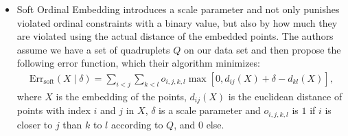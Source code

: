 \begin{itemize}
    \item Soft Ordinal Embedding  \citep[SOE,][]{teradaLocalOrdinalEmbedding2014} 
        introduces a scale parameter and not only punishes violated ordinal constraints
        with a binary value, but also by how much they are violated using the
        actual distance of the embedded points.
        The authors assume we have a set of quadruplets $Q$ on our data set
        and then propose the following error function, which their algorithm minimizes:
        \begin{align*}
            \text{Err}_{\text{soft}}(X  \mid  \delta) = \sum_{i<j} \sum_{k<l} o_{i,j,k,l} 
            \max [0, d_{ij}(X) + \delta - d_{kl}(X)]
        ,\end{align*}
        where $X$ is the embedding of the points, $d_{ij}(X)$ is the euclidean distance 
        of points with index $i$ and $j$ in $X$, $\delta$ is a scale parameter and $o_{i,j,k,l}$
        is $1$ if $i$ is closer to $j$ than $k$ to $l$ according to $Q$, and $0$ else.


\end{itemize}
